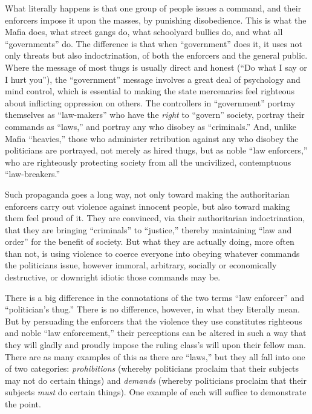 \documentclass{book}
\begin{document}
What literally happens is that one group of people issues a command, and their enforcers impose it upon the masses, by punishing disobedience. This is what the Mafia does, what street gangs do, what schoolyard bullies do, and what all \enquote{governments} do. The difference is that when \enquote{government} does it, it uses not only threats but also indoctrination, of both the enforcers and the general public. Where the message of most thugs is usually direct and honest (\enquote{Do what I say or I hurt you}), the \enquote{government} message involves a great deal of psychology and mind control, which is essential to making the state mercenaries feel righteous about inflicting oppression on others. The controllers in \enquote{government} portray themselves as \enquote{law-makers} who have the \emph{right} to \enquote{govern} society, portray their commands as \enquote{laws,} and portray any who disobey as \enquote{criminals.} And, unlike Mafia \enquote{heavies,} those who administer retribution against any who disobey the politicians are portrayed, not merely as hired thugs, but as noble \enquote{law enforcers,} who are righteously protecting society from all the uncivilized, contemptuous \enquote{law-breakers.}

Such propaganda goes a long way, not only toward making the authoritarian enforcers carry out violence against innocent people, but also toward making them feel proud of it. They are convinced, via their authoritarian indoctrination, that they are bringing \enquote{criminals} to \enquote{justice,} thereby maintaining \enquote{law and order} for the benefit of society. But what they are actually doing, more often than not, is using violence to coerce everyone into obeying whatever commands the politicians issue, however immoral, arbitrary, socially or economically destructive, or downright idiotic those commands may be.

There is a big difference in the connotations of the two terms \enquote{law enforcer} and \enquote{politician's thug.} There is no difference, however, in what they literally mean. But by persuading the enforcers that the violence they use constitutes righteous and noble \enquote{law enforcement,} their perceptions can be altered in such a way that they will gladly and proudly impose the ruling class's will upon their fellow man. There are as many examples of this as there are \enquote{laws,} but they all fall into one of two categories: \emph{prohibitions} (whereby politicians proclaim that their subjects may not do certain things) and \emph{demands} (whereby politicians proclaim that their subjects \emph{must} do certain things). One example of each will suffice to demonstrate the point.
\end{document}
